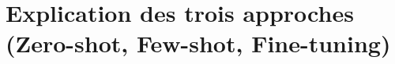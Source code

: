 \chapter{Explication des trois approches (Zero-shot, Few-shot, Fine-tuning)}
    \section{}
        \subsection{}
            \subsubsection{}